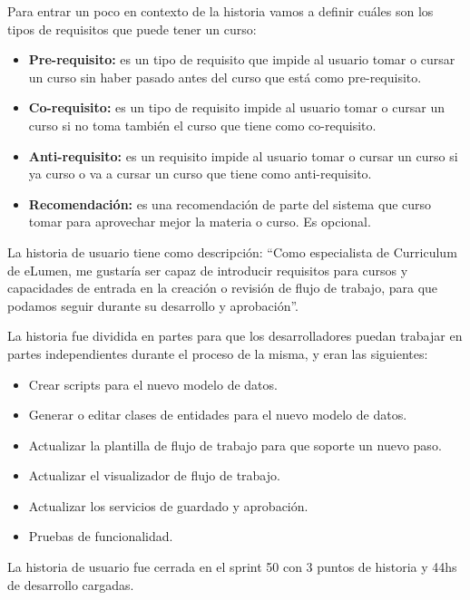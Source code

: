 Para entrar un poco en contexto de la historia vamos a definir cuáles son los tipos de requisitos que puede tener un curso:

\begin{itemize}
	\item \textbf{Pre-requisito:} es un tipo de requisito que impide al usuario tomar o cursar un curso sin haber pasado antes del curso que está como pre-requisito.
	\item \textbf{Co-requisito:} es un tipo de requisito impide al usuario tomar o cursar un curso si no toma también el curso que tiene como co-requisito.
	\item \textbf{Anti-requisito:} es un requisito impide al usuario tomar o cursar un curso si ya curso o va a cursar un curso que tiene como anti-requisito.
	\item \textbf{Recomendación:} es una recomendación de parte del sistema que curso tomar para aprovechar mejor la materia o curso. Es opcional.
\end{itemize}

La historia de usuario tiene como descripción: “Como especialista de Curriculum de eLumen, me gustaría ser capaz de introducir requisitos para cursos y capacidades de entrada en la creación o revisión de flujo de trabajo, para que podamos seguir durante su desarrollo y aprobación”.

La historia fue dividida en partes para que los desarrolladores puedan trabajar en partes independientes durante el proceso de la misma, y eran las siguientes:
\begin{itemize}
	\item Crear scripts para el nuevo modelo de datos.
	\item Generar o editar clases de entidades para el nuevo modelo de datos.
	\item Actualizar la plantilla de flujo de trabajo para que soporte un nuevo paso.
	\item Actualizar el visualizador de flujo de trabajo.
	\item Actualizar los servicios de guardado y aprobación.
	\item Pruebas de funcionalidad.
\end{itemize}

La historia de usuario fue cerrada en el sprint 50 con 3 puntos de historia y 44hs de desarrollo cargadas.

